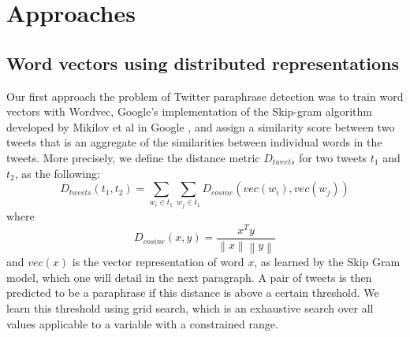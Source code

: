 \documentclass[conference]{IEEEtran}
\begin{document}
 \section{Approaches}

\subsection{Word vectors using distributed representations}
Our first approach the problem of Twitter paraphrase detection was to train word vectors with Wordvec, Google's implementation of the Skip-gram algorithm developed by Mikilov et al in Google \cite{Mikolov}, and assign a similarity score between two tweets that is an aggregate of the similarities between individual words in the tweets.  More precisely, we define the distance metric $D_{tweets}$ for two tweets $t_1$ and $t_2$, as the following:
\begin{equation}
D_{tweets}(t_1, t_2) = \sum_{w_i \in t_1} \sum_{w_j \in t_1} D_{cosine}(vec(w_i), vec(w_j))
\end{equation}
where $$D_{cosine}(x, y) = \frac{x^Ty}{\left \| x \right \| \left \|y \right \|}$$ and $vec(x)$ is the vector representation of word $x$, as learned by the Skip Gram model, which one will detail in the next paragraph.  A pair of tweets is then predicted to be a paraphrase if this distance is above a certain threshold.  We learn this threshold using grid search, which is an exhaustive search over all values applicable to a variable with a constrained range.\\
\end{document}
